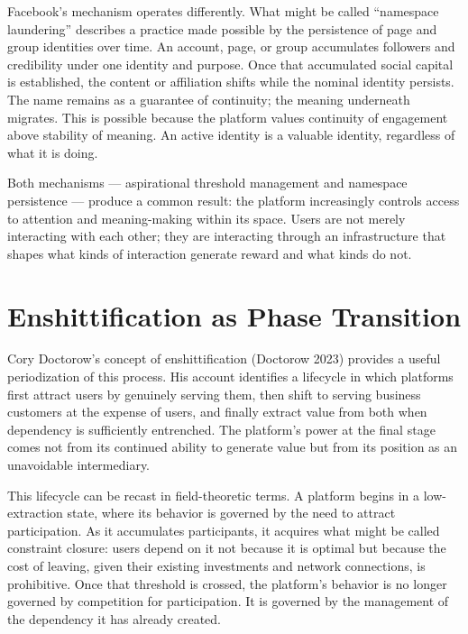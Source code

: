 \documentclass[12pt, a4paper]{article}
\begin{document}
Facebook's mechanism operates differently. What might be called ``namespace
laundering'' describes a practice made possible by the persistence of page and
group identities over time. An account, page, or group accumulates followers
and credibility under one identity and purpose. Once that accumulated social
capital is established, the content or affiliation shifts while the nominal
identity persists. The name remains as a guarantee of continuity; the meaning
underneath migrates. This is possible because the platform values continuity
of engagement above stability of meaning. An active identity is a valuable
identity, regardless of what it is doing.

Both mechanisms --- aspirational threshold management and namespace persistence
--- produce a common result: the platform increasingly controls access to
attention and meaning-making within its space. Users are not merely interacting
with each other; they are interacting through an infrastructure that shapes
what kinds of interaction generate reward and what kinds do not.

\section{Enshittification as Phase Transition}

Cory Doctorow's concept of enshittification (Doctorow 2023) provides
a useful periodization of this process. His account identifies a lifecycle in
which platforms first attract users by genuinely serving them, then shift to
serving business customers at the expense of users, and finally extract value
from both when dependency is sufficiently entrenched. The platform's power at
the final stage comes not from its continued ability to generate value but from
its position as an unavoidable intermediary.

This lifecycle can be recast in field-theoretic terms. A platform begins in a
low-extraction state, where its behavior is governed by the need to attract
participation. As it accumulates participants, it acquires what might be called
constraint closure: users depend on it not because it is optimal but because
the cost of leaving, given their existing investments and network connections,
is prohibitive. Once that threshold is crossed, the platform's behavior is no
longer governed by competition for participation. It is governed by the
management of the dependency it has already created.
\end{document}
